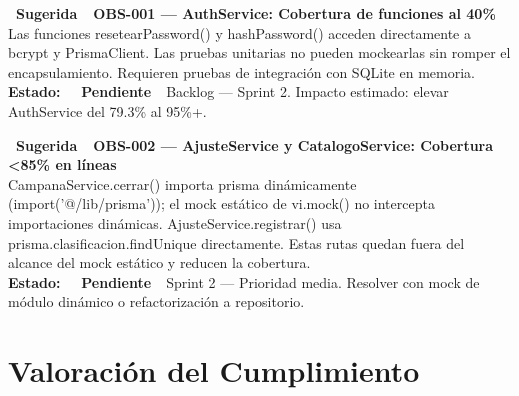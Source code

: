 \documentclass[12pt, a4paper]{article}
\newcommand{\badgePending}{\colorbox{CWarningBg}{\color{CWarning}\small\bfseries\ \faClock\ Pendiente\ }}
\newcommand{\badgeSuggested}{\colorbox{CAccentBg}{\color{CAccent}\small\bfseries\ Sugerida\ }}
\newcommand{\code}[1]{\colorbox{CCodeBg}{\color{CCode}\ttfamily\small #1}}
\begin{document}
\vspace{10pt}

\begin{defectsuggested}
\textbf{\badgeSuggested\ OBS-001 --- AuthService: Cobertura de funciones al 40\%}\\[4pt]
Las funciones \code{resetearPassword()} y \code{hashPassword()} acceden directamente a \code{bcrypt} y \code{PrismaClient}. Las pruebas unitarias no pueden mockearlas sin romper el encapsulamiento. Requieren pruebas de integración con SQLite en memoria.\\[4pt]
\textbf{Estado:} \badgePending\ Backlog --- Sprint 2. Impacto estimado: elevar AuthService del 79.3\% al 95\%+.
\end{defectsuggested}

\vspace{10pt}

\begin{defectsuggested}
\textbf{\badgeSuggested\ OBS-002 --- AjusteService y CatalogoService: Cobertura \textless 85\% en líneas}\\[4pt]
\code{CampanaService.cerrar()} importa \code{prisma} dinámicamente (\code{import('@/lib/prisma')}); el mock estático de \code{vi.mock()} no intercepta importaciones dinámicas. \code{AjusteService.registrar()} usa \code{prisma.clasificacion.findUnique} directamente. Estas rutas quedan fuera del alcance del mock estático y reducen la cobertura.\\[4pt]
\textbf{Estado:} \badgePending\ Sprint 2 --- Prioridad media. Resolver con mock de módulo dinámico o refactorización a repositorio.
\end{defectsuggested}

\newpage

\section{Valoración del Cumplimiento}
\end{document}
